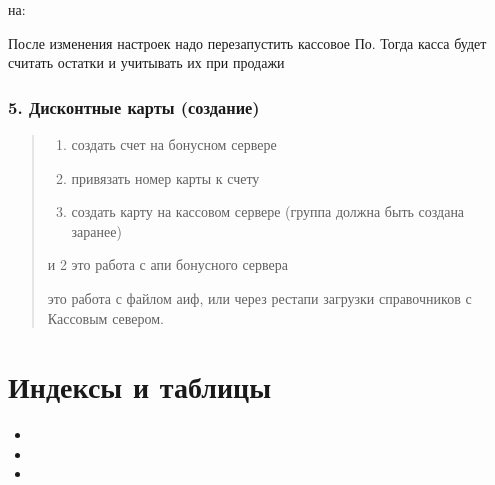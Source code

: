 \documentclass[twoside,11pt,a4paper,notitlepage]{report}
\begin{document}
\begin{sphinxVerbatim}[commandchars=\\\{\}]
  
  
\end{sphinxVerbatim}

\sphinxAtStartPar
на:

\begin{sphinxVerbatim}[commandchars=\\\{\}]
  
  
\end{sphinxVerbatim}

\sphinxAtStartPar
После изменения настроек надо перезапустить кассовое По.
Тогда касса будет считать остатки и учитывать их при продажи


\subsection{5. Дисконтные карты (создание)}
\label{\detokenize{additional:id5}}\begin{quote}
\begin{enumerate}
%
\item {} 
\sphinxAtStartPar
создать счет на бонусном сервере

\item {} 
\sphinxAtStartPar
привязать номер карты к счету

\item {} 
\sphinxAtStartPar
создать карту на кассовом сервере (группа должна быть создана заранее)

\end{enumerate}

 и 2 это работа с апи бонусного сервера

 это работа с файлом аиф, или через рестапи загрузки справочников с Кассовым севером.

\sphinxAtStartPar
{}
\end{quote}


\chapter{Индексы и таблицы}
\label{\detokenize{index:id1}}\begin{itemize}
\item {} 
\sphinxAtStartPar
{}

\item {} 
\sphinxAtStartPar
{}

\item {} 
\sphinxAtStartPar
{}

\end{itemize}
\end{document}
